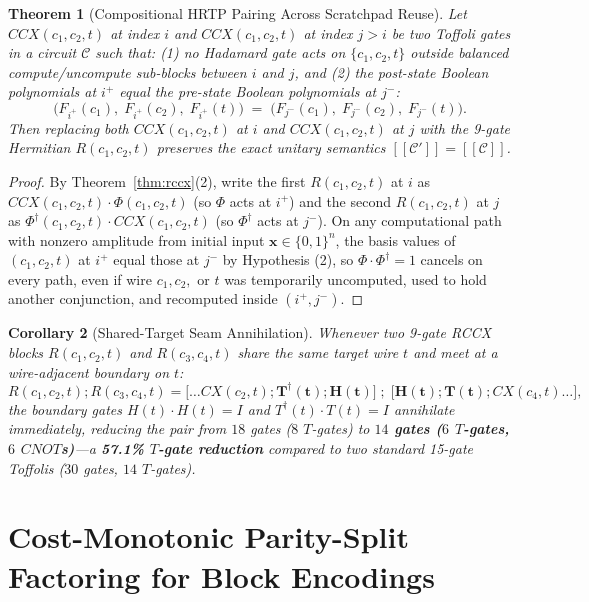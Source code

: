 \documentclass[11pt,a4paper]{article}
\newcommand{\llbracket}{[\![}
\newcommand{\rrbracket}{]\!]}
\newtheorem{theorem}{Theorem}[section]
\newtheorem{corollary}[theorem]{Corollary}
\theoremstyle{definition}
\begin{document}
\begin{theorem}[Compositional \textsc{HRTP} Pairing Across Scratchpad Reuse]
\label{thm:hrtp}
Let $\mathit{CCX}(c_1, c_2, t)$ at index $i$ and $\mathit{CCX}(c_1, c_2, t)$ at index $j > i$ be two Toffoli gates in a circuit $\mathcal{C}$ such that:
(1) no Hadamard gate acts on $\{c_1, c_2, t\}$ outside balanced compute/uncompute sub-blocks between $i$ and $j$, and
(2) the post-state Boolean polynomials at $i^+$ equal the pre-state Boolean polynomials at $j^-$:
\[
  \big(F_{i^+}(c_1),\; F_{i^+}(c_2),\; F_{i^+}(t)\big) \;=\; \big(F_{j^-}(c_1),\; F_{j^-}(c_2),\; F_{j^-}(t)\big).
\]
Then replacing both $\mathit{CCX}(c_1, c_2, t)$ at $i$ and $\mathit{CCX}(c_1, c_2, t)$ at $j$ with the 9-gate Hermitian $R(c_1, c_2, t)$ preserves the exact unitary semantics $\llbracket \mathcal{C}' \rrbracket = \llbracket \mathcal{C} \rrbracket$.
\end{theorem}
\begin{proof}
By Theorem~\ref{thm:rccx}(2), write the first $R(c_1, c_2, t)$ at $i$ as $\mathit{CCX}(c_1, c_2, t) \cdot \Phi(c_1, c_2, t)$ (so $\Phi$ acts at $i^+$) and the second $R(c_1, c_2, t)$ at $j$ as $\Phi^\dagger(c_1, c_2, t) \cdot \mathit{CCX}(c_1, c_2, t)$ (so $\Phi^\dagger$ acts at $j^-$). On any computational path with nonzero amplitude from initial input $\mathbf{x} \in \{0,1\}^n$, the basis values of $(c_1, c_2, t)$ at $i^+$ equal those at $j^-$ by Hypothesis (2), so $\Phi \cdot \Phi^\dagger = 1$ cancels on every path, even if wire $c_1, c_2,$ or $t$ was temporarily uncomputed, used to hold another conjunction, and recomputed inside $(i^+, j^-)$.
\end{proof}

\begin{corollary}[Shared-Target Seam Annihilation]
Whenever two 9-gate \textsc{RCCX} blocks $R(c_1, c_2, t)$ and $R(c_3, c_4, t)$ share the same target wire $t$ and meet at a wire-adjacent boundary on $t$:
\[
  R(c_1, c_2, t) ; R(c_3, c_4, t) = \big[\dots \mathit{CX}(c_2,t); \mathbf{T^\dagger(t)}; \mathbf{H(t)}\big] \;;\; \big[\mathbf{H(t)}; \mathbf{T(t)}; \mathit{CX}(c_4,t) \dots\big],
\]
the boundary gates $H(t)\cdot H(t) = I$ and $T^\dagger(t)\cdot T(t) = I$ annihilate immediately, reducing the pair from $18$ gates ($8$ $T$-gates) to \textbf{$14$ gates ($6$ $T$-gates, $6$ $\mathit{CNOT}$s)}---a \textbf{57.1\% $T$-gate reduction} compared to two standard 15-gate Toffolis ($30$ gates, $14$ $T$-gates).
\end{corollary}

\section{Cost-Monotonic Parity-Split Factoring for Block Encodings}
\label{sec:parity-split}
\end{document}
